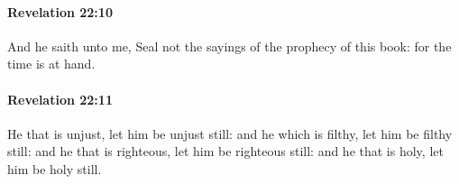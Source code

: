 		\paragraph{Revelation 22:10} %
			\label{REVELATIONNT-22-10}

			And he saith unto me, Seal not the sayings of the prophecy of this book: for the time is at hand.

			\begin{framed}
			\scriptsize
				\begin{compactdesc}
					\item[SBLG] 
				\end{compactdesc}
			\end{framed}

		\paragraph{Revelation 22:11} %
			\label{REVELATIONNT-22-11}

			He that is unjust, let him be unjust still: and he which is filthy, let him be filthy still: and he that is righteous, let him be righteous still: and he that is holy, let him be holy still.

